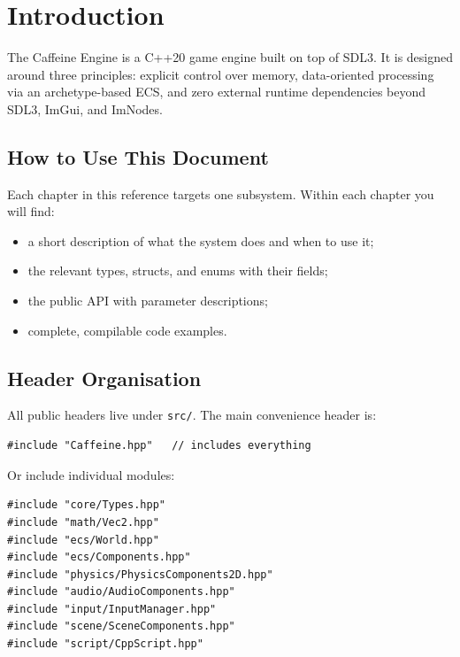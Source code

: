 \chapter{Introduction}

The Caffeine Engine is a C++20 game engine built on top of SDL3. It is
designed around three principles: explicit control over memory, data-oriented
processing via an archetype-based ECS, and zero external runtime dependencies
beyond SDL3, ImGui, and ImNodes.

\section{How to Use This Document}

Each chapter in this reference targets one subsystem. Within each chapter
you will find:
\begin{itemize}[noitemsep]
  \item a short description of what the system does and when to use it;
  \item the relevant types, structs, and enums with their fields;
  \item the public API with parameter descriptions;
  \item complete, compilable code examples.
\end{itemize}

\section{Header Organisation}

All public headers live under \texttt{src/}. The main convenience header is:

\begin{lstlisting}
#include "Caffeine.hpp"   // includes everything
\end{lstlisting}

Or include individual modules:

\begin{lstlisting}
#include "core/Types.hpp"
#include "math/Vec2.hpp"
#include "ecs/World.hpp"
#include "ecs/Components.hpp"
#include "physics/PhysicsComponents2D.hpp"
#include "audio/AudioComponents.hpp"
#include "input/InputManager.hpp"
#include "scene/SceneComponents.hpp"
#include "script/CppScript.hpp"
\end{lstlisting}

